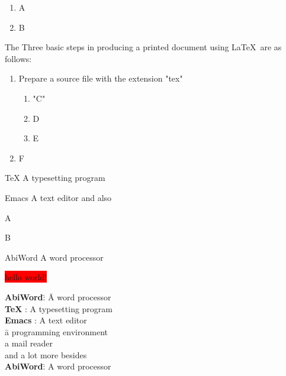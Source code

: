\documentclass[11pt, oneside]{article}   	%
\begin{document}
\begin{enumerate}
	\item A
	\item B
\end{enumerate}

The Three basic steps in producing a printed document using \LaTeX\ are as follows:
\begin{enumerate}
	\item Prepare a source file with the extension "tex"
	\begin{enumerate}
		\item "C"
		\item D
		\item E\
	\end{enumerate}
	\item F
\end{enumerate}

\begin{description}
	\item{\TeX} A typesetting program
	\item{Emacs} A text editor and also
	\begin{description}
		\item A
		\item B
	\end{description}
	\item{AbiWord} A word processor\cite{MFS_prokaryotic_glucose_transporter}
\end{description}

\colorbox{red}{hello world!}



\begin{tabbing}
	\textbf{AbiWord}\quad\= : \=A word processor\kill\\
	\textbf{\TeX}\quad        \> : \>A typesetting program\\[5pt]
	\textbf{Emacs}\quad    \> : \>A text editor\\[5pt]
					       \>    \>\quad\=a programming environment\\[5pt]
					       \>    \>             \>a mail reader\\[5pt]
					       \>    \>             \>and a lot more besides\\[5pt]
	\textbf{AbiWord}\quad\= : \>A word processor
\end{tabbing}
\end{document}
